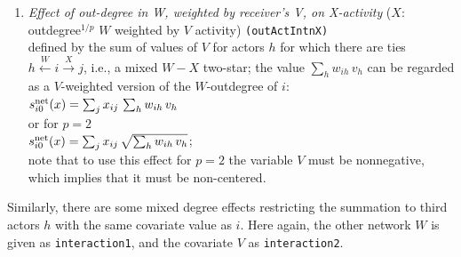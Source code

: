 \documentclass[a4paper,fleqn,11pt]{article}
\newcommand{\+}{\, + \,}
\newcommand{\vit}{\theenumi}
\newcounter{savenumi}
\begin{document}
\begin{enumerate}
 \item {\em Effect of out-degree in W, weighted by receiver's V, on X-activity }
 ($X$: outdegree$^{1/p}$ $W$ weighted by $V$ activity)   \texttt{(outActIntnX)}\\
 defined by the sum of values of $V$ for actors $h$
 for which there are ties  $h \stackrel{W}{\leftarrow} i \stackrel{X}{\rightarrow} j$,
 i.e., a mixed $W - X$ two-star;
 the value $\sum_h w_{ih}\,v_h$ can be regarded as a $V$-weighted
 version of the $W$-outdegree of $i$:\\
 $s^{\rm net}_{i\vit}(x) =  \sum_j x_{ij}\, \sum_h w_{ih}\,v_h  $ \\
 or for $p=2$ \\
   $s^{\rm net}_{i\vit}(x) =  \sum_j x_{ij}\, \sqrt{\sum_h w_{ih}\,v_h}   $;\\
 note that to use this effect for $p=2$ the variable $V$ must be nonnegative,
 which implies that it must be non-centered.
\setcounter{savenumi}{\value{enumi}}
\end{enumerate}

Similarly, there are some mixed degree effects restricting the summation
to third actors $h$ with the same covariate value as $i$.
Here again, the other network $W$ is given as \texttt{interaction1},
and the covariate $V$ as \texttt{interaction2}.
\end{document}
